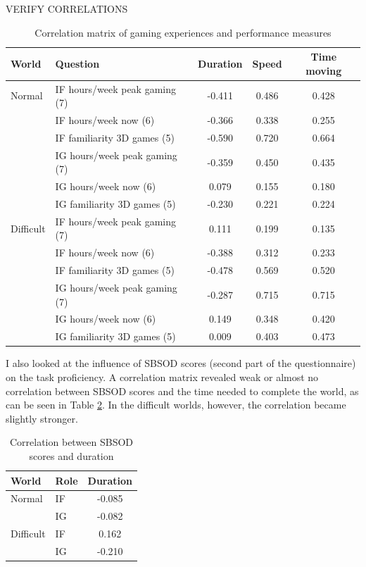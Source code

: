 VERIFY CORRELATIONS

\begin{table}[!htbp]
 \centering
\begin{tabular}{llccc}
\toprule
World & Question  & Duration & Speed & Time moving  \\
\midrule
Normal 	& IF hours/week peak gaming (7) 	& -0.411 &	0.486 &	0.428\\
 		& IF hours/week now 	(6)			& -0.366	 & 	0.338 &	0.255\\
 		& IF familiarity 3D games (5)	& -0.590	 &	0.720 &	0.664\\
 		& IG hours/week peak gaming (7) 	& -0.359 &	0.450 &	0.435\\
 		& IG hours/week now 	(6)			& 0.079	 &	0.155 &	0.180\\
 		& IG familiarity 3D games (5)	& -0.230 &	0.221 &	0.224\\
\midrule
Difficult& IF hours/week peak gaming (7) & 0.111 &	0.199 &	0.135\\
 		& IF hours/week now (6)			& -0.388 &	0.312 &	0.233\\
 		& IF familiarity 3D games (5)	& -0.478 &	0.569 &	0.520\\
 		& IG hours/week peak gaming (7) 	& -0.287 &	0.715 &	0.715\\
 		& IG hours/week now (6)			& 0.149 &	0.348 &	0.420\\
 		& IG familiarity 3D games (5)	& 0.009 &	0.403 &	0.473\\
\bottomrule
\end{tabular}
\caption{Correlation matrix of gaming experiences and performance measures}
\label{tab:demfactors-gaming}
\end{table}

I also looked at the influence of SBSOD scores (second part of the questionnaire) on the task proficiency. A correlation matrix revealed weak or almost no correlation between SBSOD scores and the time needed to complete the world, as can be seen in Table \ref{tab:demfactors-sbsod}. In the difficult worlds, however, the correlation became slightly stronger.

\begin{table}[!htbp]
 \centering
\begin{tabular}{llc}
\toprule
 World & Role   & Duration \\
\midrule
Normal & IF &	-0.085\\
 & IG &	-0.082\\
\midrule
Difficult & IF & 0.162\\
 & IG &	-0.210\\
\bottomrule
\end{tabular}
\caption{Correlation between SBSOD scores and duration}
\label{tab:demfactors-sbsod}
\end{table}

